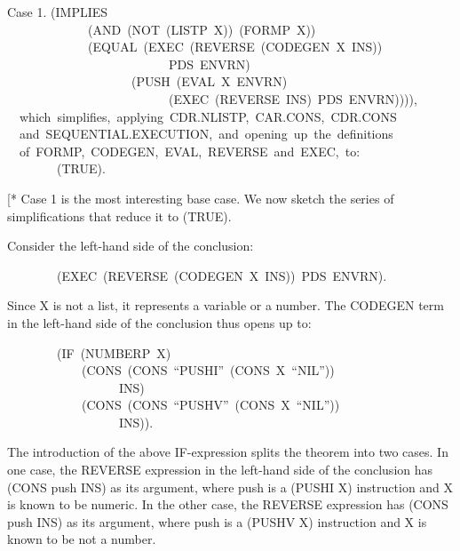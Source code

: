 \documentclass[10pt]{book}
\newenvironment{pubasis}{\begin{flushleft}}{\end{flushleft}}
\begin{document}
\begin{pubasis}
Case 1.	(IMPLIES\\
~~~~~~~~~~~~~(AND~(NOT~(LISTP~X))~(FORMP~X))\\
~~~~~~~~~~~~~(EQUAL~(EXEC~(REVERSE~(CODEGEN~X~INS))\\
~~~~~~~~~~~~~~~~~~~~~~~~~~PDS~ENVRN)\\
~~~~~~~~~~~~~~~~~~~~(PUSH~(EVAL~X~ENVRN)\\
~~~~~~~~~~~~~~~~~~~~~~~~~~(EXEC~(REVERSE~INS)~PDS~ENVRN)))),\\

~~which~simplifies,~applying~CDR.NLISTP,~CAR.CONS,~CDR.CONS\\
~~and~SEQUENTIAL.EXECUTION,~and~opening~up~the~definitions\\
~~of~FORMP,~CODEGEN,~EVAL,~REVERSE~and~EXEC,~to:\\

~~~~~~~~(TRUE).\\
\end{pubasis}
[* Case 1 is the most interesting base case.  We  now sketch the
series of simplifications that reduce it to (TRUE).

Consider the left-hand side of the conclusion:
\begin{pubasis}
~~~~~~~~(EXEC~(REVERSE~(CODEGEN~X~INS))~PDS~ENVRN).\\
\end{pubasis}
Since X is not a list, it represents
a variable or a number.  The CODEGEN term in the left-hand side of the conclusion
thus opens up to:
\begin{pubasis}
~~~~~~~~(IF~(NUMBERP~X)\\
~~~~~~~~~~~~(CONS~(CONS~``PUSHI''~(CONS~X~``NIL''))\\
~~~~~~~~~~~~~~~~~~INS)\\
~~~~~~~~~~~~(CONS~(CONS~``PUSHV''~(CONS~X~``NIL''))\\
~~~~~~~~~~~~~~~~~~INS)).\\
\end{pubasis}
The introduction of the above IF-expression  splits the theorem into two cases.  In one case, the REVERSE
expression in the left-hand side of the conclusion
has (CONS push INS) as its argument, where push is a
(PUSHI X) instruction and X is known to be numeric.  In the other case,
the REVERSE expression has (CONS push INS) as its argument, where push
is a (PUSHV X) instruction and X is known to be not a number.
\end{document}
